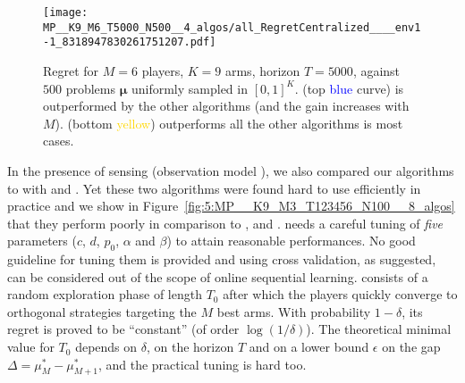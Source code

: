 %
%
\begin{figure}[!h]
    \texttt{[image: MP\_\_K9\_M6\_T5000\_N500\_\_4\_algos/all\_RegretCentralized\_\_\_\_env1-1\_8318947830261751207.pdf]}
  \caption[Regret for $M=6$ players, $K=9$ arms, horizon $T=5000$, against $500$ problems $\boldsymbol{\mu}$ uniformly sampled]{Regret for $M=6$ players, $K=9$ arms, horizon $T=5000$, against $500$ problems $\boldsymbol{\mu}$ uniformly sampled in $[0,1]^K$. \rhoRand{} (top \textcolor{blue}{blue} curve) is outperformed by the other algorithms (and the gain increases with $M$). \MCTopM{} (bottom \textcolor{gold}{yellow}) outperforms all the other algorithms is most cases.}
  \label{fig:5:MP__K9_M6_T5000_N500__4_algos__all_RegretCentralized__BayesianProblems}
\end{figure}



In the presence of sensing (observation model \modeldeux), we also compared our algorithms to  %
with \MEGA{} \citep{Avner15} and \MusicalChair{} \citep{Rosenski16}. Yet these two algorithms were found hard to use efficiently in practice and we show in
%
Figure~\ref{fig:5:MP__K9_M3_T123456_N100__8_algos} that they perform poorly in comparison to \rhoRand, \RandTopM{} and \MCTopM.
%
\MEGA{} needs a careful tuning of \emph{five} parameters ($c$, $d$, $p_0$, $\alpha$ and $\beta$) to attain reasonable performances. No good guideline for tuning them is provided and using cross validation, as suggested,
can be considered out of the scope of online sequential learning.
%
\MusicalChair{} consists of a random exploration phase of length $T_0$ after which the players quickly converge to orthogonal strategies targeting the $M$ best arms. With probability $1-\delta$, its regret is proved to be ``constant'' (of order $\log(1/\delta)$). The theoretical minimal value for $T_0$ depends on $\delta$, on the horizon $T$ and on a lower bound $\epsilon$ on the gap $\Delta = \mu^*_M - \mu^*_{M+1}$, and the practical tuning is hard too. %



